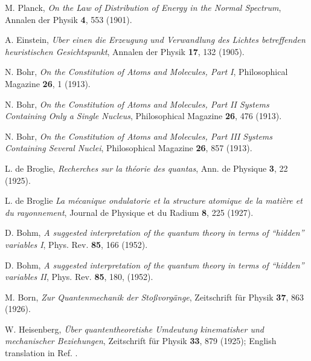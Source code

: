 \documentclass[nofootinbib, secnumarabic, amsmath, nobibnotes,11pt,aps,pra, floatfix]{revtex4-1}
\begin{document}
\setcounter{enumiv}{0}
\begin{thebibliography}{999}

M. Planck, \emph{On the Law of Distribution of Energy in the Normal Spectrum}, Annalen der Physik \textbf{4},   553 (1901).

A. Einstein, \emph{Uber einen die Erzeugung und Verwandlung des Lichtes betreffenden heuristischen Gesichtspunkt}, Annalen der Physik \textbf{17},   132 (1905).

N. Bohr, \emph{On the Constitution of Atoms and Molecules, Part I}, Philosophical Magazine \textbf{26},  1 (1913).

N. Bohr, \emph{On the Constitution of Atoms and Molecules, Part II Systems Containing Only a Single Nucleus}, Philosophical Magazine \textbf{26},  476 (1913).

N. Bohr, \emph{On the Constitution of Atoms and Molecules, Part III Systems Containing Several Nuclei}, Philosophical Magazine \textbf{26},  857 (1913).

L. de Broglie, \emph{Recherches sur la th\'{e}orie des quantas}, Ann. de Physique \textbf{3},  22 (1925).

L. de Broglie \emph{La m\'{e}canique ondulatorie et la structure atomique de la mati\`ere et du rayonnement}, Journal de Physique et du Radium \textbf{8},  225 (1927).

D. Bohm, \emph{A suggested interpretation of the quantum theory in terms of ``hidden'' variables  I}, Phys. Rev. {\bf 85},  166 (1952).

D. Bohm, \emph{A suggested interpretation of the quantum theory in terms of ``hidden'' variables  II}, Phys. Rev. {\bf 85},  180, (1952).

M. Born, \emph{Zur Quantenmechanik der Stoßvorg\"{a}nge}, Zeitschrift f\"{u}r Physik \textbf{37},  863 (1926).

W. Heisenberg, \emph{\"{U}ber quantentheoretishe Umdeutung kinematisher und mechanischer Beziehungen}, Zeitschrift f\"{u}r Physik \textbf{33},  879 (1925); English translation in Ref. \cite{om.waerden}.


\end{thebibliography}
\end{document}
